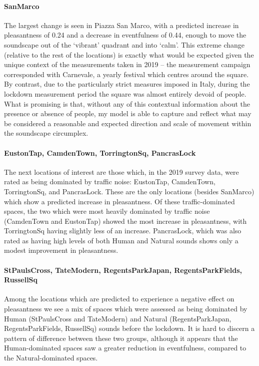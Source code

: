   \paragraph{SanMarco} The largest change is seen in Piazza San Marco, with a predicted increase in pleasantness of 0.24 and a decrease in eventfulness of 0.44, enough to move the soundscape out of the `vibrant' quadrant and into `calm'. This extreme change (relative to the rest of the locations) is exactly what would be expected given the unique context of the measurements taken in 2019 -- the measurement campaign corresponded with Carnevale, a yearly festival which centres around the square. By contrast, due to the particularly strict measures imposed in Italy, during the lockdown measurement period the square was almost entirely devoid of people. What is promising is that, without any of this contextual information about the presence or absence of people, my model is able to capture and reflect what may be considered a reasonable and expected direction and scale of movement within the soundscape circumplex.

   \paragraph{EustonTap, CamdenTown, TorringtonSq, PancrasLock} The next locations of interest are those which, in the 2019 survey data, were rated as being dominated by traffic noise: EustonTap, CamdenTown, TorringtonSq, and PancrasLock. These are the only locations (besides SanMarco) which show a predicted increase in pleasantness. Of these traffic-dominated spaces, the two which were most heavily dominated by traffic noise (CamdenTown and EustonTap) showed the most increase in pleasantness, with TorringtonSq having slightly less of an increase. PancrasLock, which was also rated as having high levels of both Human and Natural sounds shows only a modest improvement in pleasantness.

   \paragraph{StPaulsCross, TateModern, RegentsParkJapan, RegentsParkFields, RussellSq} Among the locations which are predicted to experience a negative effect on pleasantness we see a mix of spaces which were assessed as being dominated by Human (StPaulsCross and TateModern) and Natural (RegentsParkJapan, RegentsParkFields, RussellSq) sounds before the lockdown. It is hard to discern a pattern of difference between these two groups, although it appears that the Human-dominated spaces saw a greater reduction in eventfulness, compared to the Natural-dominated spaces.

